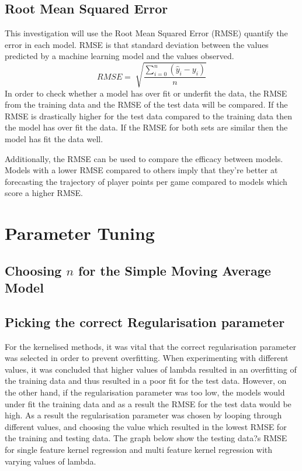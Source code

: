 \documentclass[a4paper,11pt,twoside]{article}
\begin{document}
\subsection{Root Mean Squared Error}
This investigation will use the Root Mean Squared Error (RMSE) quantify the error in each model. RMSE is that standard deviation between the values predicted by a machine learning model and the values observed.
\begin{equation}
RMSE = \sqrt[]{\frac{\sum_{i=0}^{n}(\hat{y}_{i} - y_{i})}{n}}
\end{equation}
In order to check whether a model has over fit or underfit the data, the RMSE from the training data and the RMSE of the test data will be compared. If the RMSE is drastically higher for the test data compared to the training data then the model has over fit the data. If the RMSE for both sets are similar then the model has fit the data well. 

Additionally, the RMSE can be used to compare the efficacy between models. Models with a lower RMSE compared to others imply that they're better at forecasting the trajectory of player points per game compared to models which score a higher RMSE.


\newpage
\section{Parameter Tuning}

\subsection{Choosing $n$ for the Simple Moving Average Model}

\subsection{Picking the correct Regularisation parameter}

For the kernelised methods, it was vital that the correct regularisation parameter was selected in order to prevent overfitting. When experimenting with different values, it was concluded that higher values of lambda resulted in an overfitting of the training data and thus resulted in a poor fit for the test data. However, on the other hand, if the regularisation parameter was too low, the models would under fit the training data and as a result the RMSE for the test data would be high. As a result the regularisation parameter was chosen by looping through different values, and choosing the value which resulted in the lowest RMSE for the training and testing data. The graph below show the testing data?s RMSE for single feature kernel regression and multi feature kernel regression with varying values of lambda. 
\end{document}
